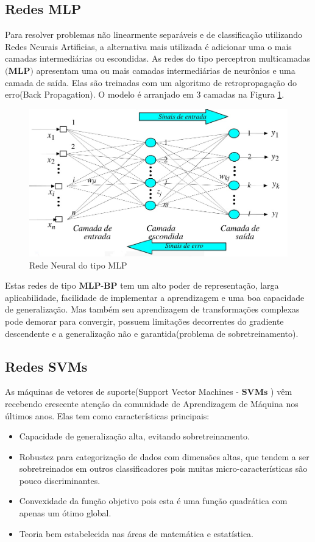 \documentclass[12pt]{article}
\begin{document}
\subsection{Redes MLP}
Para resolver problemas não linearmente separáveis e de classificação utilizando Redes Neurais Artificias, a alternativa mais utilizada é adicionar uma o mais camadas intermediárias ou escondidas. As redes do tipo perceptron multicamadas $\textbf{(MLP)}$ apresentam uma ou mais camadas intermediárias de neurônios e uma camada de saída. Elas são treinadas com um algoritmo de retropropagação do erro(Back Propagation).
O modelo é arranjado em 3 camadas na Figura \ref{fig:mlp}.
\begin{figure}[h]
\centering
\includegraphics[width=4.5in]{../out/mlp.jpg}
\caption{Rede Neural do tipo MLP}
\label{fig:mlp}
\end{figure} 

Estas redes de tipo $\textbf{MLP-BP}$ tem um alto poder de representação, larga aplicabilidade, facilidade de implementar a aprendizagem e uma boa capacidade de generalização. Mas também seu aprendizagem de transformações complexas pode demorar para convergir, possuem limitações decorrentes do gradiente descendente e a generalização não e garantida(problema de sobretreinamento).
\subsection{Redes SVMs}
As máquinas de vetores de suporte(Support Vector Machines - $\textbf{SVMs}$ ) vêm recebendo crescente atenção da comunidade de Aprendizagem de Máquina nos últimos anos. Elas tem como características principais:
\begin{itemize}
    \item Capacidade de generalização alta, evitando sobretreinamento.
    \item Robustez para categorização de dados com dimensões altas, que tendem a ser sobretreinados em outros classificadores pois muitas micro-características são pouco discriminantes.
    \item Convexidade da função objetivo pois esta é uma função quadrática com apenas um ótimo global. 
    \item Teoria bem estabelecida nas áreas de matemática e estatística.
\end{itemize}
\end{document}

